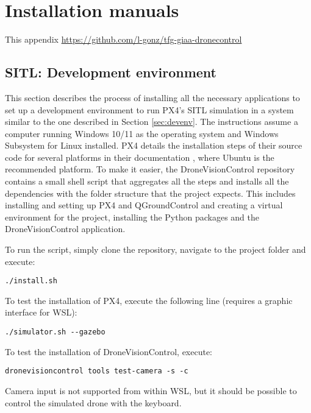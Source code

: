 \chapter{Installation manuals}

This appendix 
\url{https://github.com/l-gonz/tfg-giaa-dronecontrol}

\section{SITL: Development environment}
\label{app:install-dev-env}

This section describes the process of installing all the necessary applications to set up a development environment to run PX4's SITL simulation in a system similar to the one described in Section \ref{sec:devenv}.
The instructions assume a computer running Windows 10/11 as the operating system and Windows Subsystem for Linux installed.
PX4 details the installation steps of their source code for several platforms in their documentation \cite{install-px4}, where Ubuntu is the recommended platform.
To make it easier, the DroneVisionControl repository contains a small shell script that aggregates all the steps and installs all the dependencies with the folder structure that the project expects.
This includes installing and setting up PX4 and QGroundControl and creating a virtual environment for the project, installing the Python packages and the DroneVisionControl application.

To run the script, simply clone the repository, navigate to the project folder and execute:
\begin{verbatim}
./install.sh
\end{verbatim}

To test the installation of PX4, execute the following line (requires a graphic interface for WSL):
\begin{verbatim}
./simulator.sh --gazebo
\end{verbatim}

To test the installation of DroneVisionControl, execute:
\begin{verbatim}
dronevisioncontrol tools test-camera -s -c
\end{verbatim}
Camera input is not supported from within WSL, but it should be possible to control the simulated drone with the keyboard.

